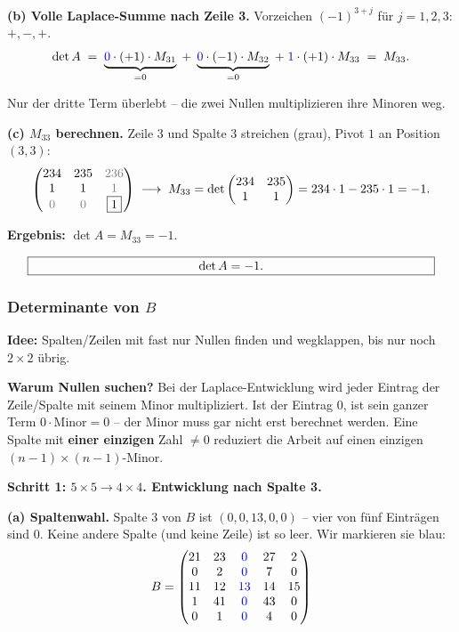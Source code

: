 \documentclass[a4paper,12pt]{article}
\begin{document}
\textbf{(b) Volle Laplace-Summe nach Zeile 3.} Vorzeichen $(-1)^{3+j}$ f\"ur $j = 1, 2, 3$: $+, -, +$.
\[
\det A
\;=\; \underbrace{\textcolor{blue}{0} \cdot (+1) \cdot M_{31}}_{= 0}
\;+\; \underbrace{\textcolor{blue}{0} \cdot (-1) \cdot M_{32}}_{= 0}
\;+\; \textcolor{blue}{1} \cdot (+1) \cdot M_{33}
\;=\; M_{33}.
\]

Nur der dritte Term \"uberlebt -- die zwei Nullen multiplizieren ihre Minoren weg.

\textbf{(c) $M_{33}$ berechnen.} Zeile 3 und Spalte 3 streichen (grau), Pivot $\boxed{1}$ an Position $(3,3)$:
\[
\begin{pmatrix}
234 & 235 & \color{gray}{236} \\
1 & 1 & \color{gray}{1} \\
\color{gray}0 & \color{gray}0 & \boxed{1}
\end{pmatrix}
\;\longrightarrow\;
M_{33} = \det \begin{pmatrix} 234 & 235 \\ 1 & 1 \end{pmatrix} = 234 \cdot 1 - 235 \cdot 1 = -1.
\]

\textbf{Ergebnis:} $\det A = M_{33} = -1$.

\[
\fbox{\parbox{0.93\textwidth}{\centering
$\det A = -1$.
}}
\]

\subsubsection*{Determinante von $B$}

\textbf{Idee:} Spalten/Zeilen mit fast nur Nullen finden und wegklappen, bis nur noch $2 \times 2$ \"ubrig.

\textbf{Warum Nullen suchen?} Bei der Laplace-Entwicklung wird jeder Eintrag der Zeile/Spalte mit seinem Minor multipliziert. Ist der Eintrag $0$, ist sein ganzer Term $0 \cdot \text{Minor} = 0$ -- der Minor muss gar nicht erst berechnet werden. Eine Spalte mit \textbf{einer einzigen} Zahl $\neq 0$ reduziert die Arbeit auf einen einzigen $(n-1)\times(n-1)$-Minor.

\textbf{Schritt 1: $5\times 5 \to 4\times 4$. Entwicklung nach Spalte 3.}

\textbf{(a) Spaltenwahl.} Spalte 3 von $B$ ist $(0, 0, 13, 0, 0)$ -- vier von f\"unf Eintr\"agen sind $0$. Keine andere Spalte (und keine Zeile) ist so leer. Wir markieren sie blau:
\[
B = \begin{pmatrix}
21 & 23 & \color{blue}0 & 27 & 2 \\
0 & 2 & \color{blue}0 & 7 & 0 \\
11 & 12 & \color{blue}{13} & 14 & 15 \\
1 & 41 & \color{blue}0 & 43 & 0 \\
0 & 1 & \color{blue}0 & 4 & 0
\end{pmatrix}
\]
\end{document}
